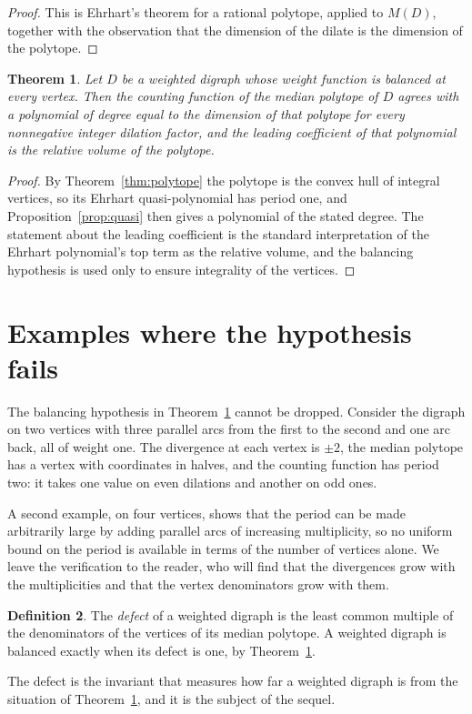 \documentclass[11pt]{article}
\theoremstyle{plain}
\newtheorem{theorem}{Theorem}[section]
\theoremstyle{definition}
\newtheorem{definition}[theorem]{Definition}
\begin{document}
\begin{proof}
This is Ehrhart's theorem for a rational polytope, applied to $M(D)$, together with the observation that the dimension of the dilate is the dimension of the polytope.
\end{proof}

\begin{theorem}\label{thm:count}
Let $D$ be a weighted digraph whose weight function is balanced at every vertex. Then the counting function of the median polytope of $D$ agrees with a polynomial of degree equal to the dimension of that polytope for every nonnegative integer dilation factor, and the leading coefficient of that polynomial is the relative volume of the polytope.
\end{theorem}

\begin{proof}
By Theorem~\ref{thm:polytope} the polytope is the convex hull of integral vertices, so its Ehrhart quasi-polynomial has period one, and Proposition~\ref{prop:quasi} then gives a polynomial of the stated degree. The statement about the leading coefficient is the standard interpretation of the Ehrhart polynomial's top term as the relative volume, and the balancing hypothesis is used only to ensure integrality of the vertices.
\end{proof}

\section{Examples where the hypothesis fails}

The balancing hypothesis in Theorem~\ref{thm:count} cannot be dropped. Consider the digraph on two vertices with three parallel arcs from the first to the second and one arc back, all of weight one. The divergence at each vertex is $\pm 2$, the median polytope has a vertex with coordinates in halves, and the counting function has period two: it takes one value on even dilations and another on odd ones.

A second example, on four vertices, shows that the period can be made arbitrarily large by adding parallel arcs of increasing multiplicity, so no uniform bound on the period is available in terms of the number of vertices alone. We leave the verification to the reader, who will find that the divergences grow with the multiplicities and that the vertex denominators grow with them.

\begin{definition}\label{def:defect}
The \emph{defect} of a weighted digraph is the least common multiple of the denominators of the vertices of its median polytope. A weighted digraph is balanced exactly when its defect is one, by Theorem~\ref{thm:count}.
\end{definition}

The defect is the invariant that measures how far a weighted digraph is from the situation of Theorem~\ref{thm:count}, and it is the subject of the sequel.
\end{document}
